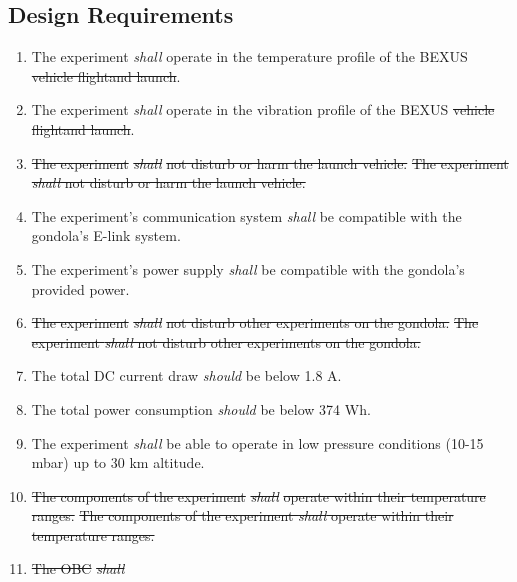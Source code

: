 \documentclass[a4paper,12pt,twoside]{article}
\providecommand{\DIFaddtex}[1]{{\protect\color{blue}\uwave{#1}}} %
\providecommand{\DIFdeltex}[1]{{\protect\color{red}\sout{#1}}}                      %
\providecommand{\DIFaddbegin}{} %
\providecommand{\DIFaddend}{} %
\providecommand{\DIFdelbegin}{} %
\providecommand{\DIFdelend}{} %
\providecommand{\DIFadd}[1]{\texorpdfstring{\DIFaddtex{#1}}{#1}} %
\providecommand{\DIFdel}[1]{\texorpdfstring{\DIFdeltex{#1}}{}} %
\newcommand{\DIFscaledelfig}{0.5}
\newlength{\DIFdelgraphicswidth} %
\newlength{\DIFdelgraphicsheight} %
\newcommand{\DIFaddincludegraphics}[2][]{{\color{blue}\fbox{\DIFOincludegraphics[#1]{#2}}}} %
\newcommand{\DIFdelincludegraphics}[2][]{%
\sbox{\DIFdelgraphicsbox}{\DIFOincludegraphics[#1]{#2}}%
\settoboxwidth{\DIFdelgraphicswidth}{\DIFdelgraphicsbox} %
\settoboxtotalheight{\DIFdelgraphicsheight}{\DIFdelgraphicsbox} %
\scalebox{\DIFscaledelfig}{%
\parbox[b]{\DIFdelgraphicswidth}{\usebox{\DIFdelgraphicsbox}\\[-\baselineskip] \rule{\DIFdelgraphicswidth}{0em}}\llap{\resizebox{\DIFdelgraphicswidth}{\DIFdelgraphicsheight}{%
\setlength{\unitlength}{\DIFdelgraphicswidth}%
\begin{picture}(1,1)%
\thicklines\linethickness{2pt} %
{\color[rgb]{1,0,0}\put(0,0){\framebox(1,1){}}}%
{\color[rgb]{1,0,0}\put(0,0){\line( 1,1){1}}}%
{\color[rgb]{1,0,0}\put(0,1){\line(1,-1){1}}}%
\end{picture}%
}\hspace*{3pt}}} %
} %
\DeclareRobustCommand{\DIFaddbegin}{\DIFOaddbegin \let\includegraphics\DIFaddincludegraphics} %
\DeclareRobustCommand{\DIFaddend}{\DIFOaddend \let\includegraphics\DIFOincludegraphics} %
\DeclareRobustCommand{\DIFdelbegin}{\DIFOdelbegin \let\includegraphics\DIFdelincludegraphics} %
\DeclareRobustCommand{\DIFdelend}{\DIFOaddend \let\includegraphics\DIFOincludegraphics} %
\begin{document}
\subsection{Design Requirements}

\begin{enumerate}[label=D.\arabic*]
    \item The experiment \textit{shall} operate in the temperature profile of the BEXUS \DIFdelbegin \DIFdel{vehicle flightand launch}\DIFdelend \DIFaddbegin \DIFadd{flight}\DIFaddend .
    \item The experiment \textit{shall} operate in the vibration profile of the BEXUS \DIFdelbegin \DIFdel{vehicle flightand launch}\DIFdelend \DIFaddbegin \DIFadd{flight}\DIFaddend .
    \item \DIFdelbegin \DIFdel{The experiment }\textit{\DIFdel{shall}} %
\DIFdel{not disturb or harm the launch vehicle.
    }\DIFdelend \DIFaddbegin \st{The experiment \textit{shall} not disturb or harm the launch vehicle.}\DIFadd{\textsuperscript{\ref{fn:unnecessary-requirement}}
    }\DIFaddend \item The experiment's communication system \textit{shall} be compatible with the gondola's E-link system.
    \item The experiment's power supply \textit{shall} be compatible with the gondola's provided power.
    \item \DIFdelbegin \DIFdel{The experiment }\textit{\DIFdel{shall}} %
\DIFdel{not disturb other experiments on the gondola.
    }\DIFdelend \DIFaddbegin \st{The experiment \textit{shall} not disturb other experiments on the gondola.}\DIFadd{\textsuperscript{\ref{fn:unnecessary-requirement}}
    }\DIFaddend \item The total DC current draw \textit{should} be below 1.8 A.
    \item The total power consumption \textit{should} be below 374 Wh.
    \item The experiment \textit{shall} be able to operate in low pressure conditions (10-15 mbar) up to 30 km altitude.
    \item \DIFdelbegin \DIFdel{The components of the experiment }\textit{\DIFdel{shall}} %
\DIFdel{operate within their temperature ranges.
    }\DIFdelend \DIFaddbegin \st{The components of the experiment \textit{shall} operate within their temperature ranges.}\DIFadd{\textsuperscript{\ref{fn:unnecessary-requirement}}
    }\DIFaddend \item \DIFdelbegin \DIFdel{The OBC }\textit{\DIFdel{shall}} %

\end{enumerate}
\end{document}
